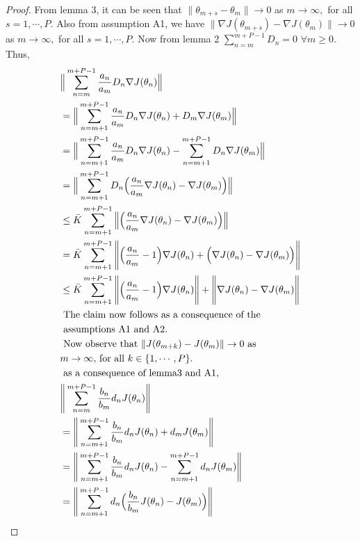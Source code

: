 \begin{proof}
 From lemma 3, it can be seen that 
 $\|\theta_{m+s}-\theta_{m}\|\rightarrow 0$ as $m\rightarrow \infty,$
 for all $s=1,\cdots,P.$ Also from assumption A1, we have
 $\|\nabla J(\theta_{m+s})-\nabla J(\theta_{m})\|\rightarrow 0$ as $m\rightarrow \infty,$
 for all $s=1,\cdots,P.$ Now from lemma 2 $\sum\limits_{n=m}^{m+P-1}D_n=0$ $\forall m\geq0.$
 Thus, 
 \begin{align*}
  &\Big{\|}\sum_{n=m}^{m+P-1}\frac{a_n}{a_m}D_n\nabla J(\theta_n)\Big{\|}\\
  & = \Big{\|}\sum_{n=m+1}^{m+P-1}\frac{a_n}{a_m}D_n\nabla J(\theta_n)
  +D_{m}\nabla J(\theta_{m})\Big{\|}\\
  &=\Big{\|}\sum_{n=m+1}^{m+P-1}\frac{a_n}{a_m}D_n \nabla J(\theta_n)
     -\sum_{n=m+1}^{m+P-1}D_n\nabla J(\theta_{m})\Big{\|}\\
  &=\Big{\|}\sum_{n=m+1}^{m+P-1}D_n\Big{(}\frac{a_n}{a_m}\nabla J(\theta_n)
  -\nabla J(\theta_{m})\Big{)}\Big{\|}\\
  &\leq \bar{K}\sum_{n=m+1}^{m+P-1}\Big{\|}\Big{(}\frac{a_n}{a_m}\nabla J(\theta_n)
  -\nabla J(\theta_{m})\Big{)}\Big{\|}\\
  &=\bar{K}\sum_{n=m+1}^{m+P-1}\Bigg{\|}\Big{(}\frac{a_n}{a_m}-1\Big{)}\nabla J(\theta_n)
   +\Big{(}\nabla J(\theta_n)-\nabla J(\theta_{m})\Big{)}\Bigg{\|}\\
  &\leq \bar{K}\sum_{n=m+1}^{m+P-1}\Bigg{\|}\Big{(}\frac{a_n}{a_m}-1\Big{)}\nabla J(\theta_n)\Bigg{\|}
  +\Bigg{\|}\nabla J(\theta_n)-\nabla J(\theta_{m})\Bigg{\|}\\
  &\text{ The claim now follows as a consequence of the}\\
  &\text{ assumptions A1 and A2.}\\
  &\text{ Now observe that $\|J(\theta_{m+k})-J(\theta_{m})\|\rightarrow 0$ as}\\
  &\text{$m\rightarrow \infty, $ for all $k \in \{1,\cdots,P\}.$ }\\
  &\text{ as a consequence of lemma3 and A1,}\\
  & \Bigg{\|}\sum_{n=m}^{m+P-1}\frac{b_n}{b_m}d_n J(\theta_n)\Bigg{\|}\\
  & =\Bigg{\|}\sum_{n=m+1}^{m+P-1}\frac{b_n}{b_m}d_n J(\theta_n)+d_m J(\theta_{m})\Bigg{\|}\\
  & =\Bigg{\|}\sum_{n=m+1}^{m+P-1}\frac{b_n}{b_m}d_n J(\theta_n)-\sum_{n=m+1}^{m+P-1}d_n J(\theta_{m})\Bigg{\|}\\
  & =\Bigg{\|}\sum_{n=m+1}^{m+P-1}d_n\Big{(}\frac{b_n}{b_m}J(\theta_n)-J(\theta_{m})\Big{)}\Bigg{\|}\\

\end{align*}
\end{proof}
